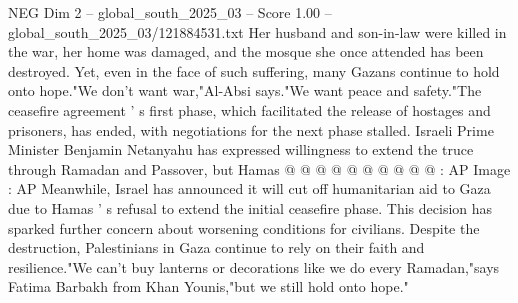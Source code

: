 \begin{textsample}{NEG Dim 2 – global\_south\_2025\_03 – Score 1.00 – global\_south\_2025\_03/121884531.txt}
Her husband and son-in-law were killed in the war, her home was damaged, and the mosque she once attended has been destroyed.
Yet, even in the face of such suffering, many Gazans continue to hold onto hope."We don't want war,"Al-Absi says."We want peace and safety."The ceasefire agreement ' s first phase, which facilitated the release of hostages and prisoners, has ended, with negotiations for the next phase stalled.
Israeli Prime Minister Benjamin Netanyahu has expressed willingness to extend the truce through Ramadan and Passover, but Hamas @ @ @ @ @ @ @ @ @ @ : AP Image : AP Meanwhile, Israel has announced it will cut off humanitarian aid to Gaza due to Hamas ' s refusal to extend the initial ceasefire phase.
This decision has sparked further concern about worsening conditions for civilians.
Despite the destruction, Palestinians in Gaza continue to rely on their faith and resilience."We can't buy lanterns or decorations like we do every Ramadan,"says Fatima Barbakh from Khan Younis,"but we still hold onto hope."

\end{textsample}
